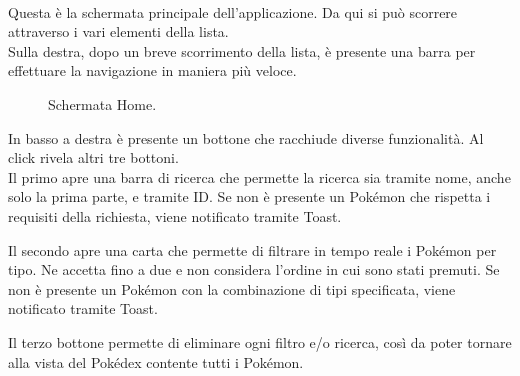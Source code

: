 \documentclass[a4paper,11pt]{article}
\begin{document}
  \paragraph{}
  Questa è la schermata principale dell’applicazione. Da qui si può scorrere attraverso i vari elementi della lista.\\
Sulla destra, dopo un breve scorrimento della lista, è presente una barra per effettuare la navigazione in maniera più veloce.\\
  \begin{figure}[h!]
    \centering
	\caption{Schermata Home.}
\end{figure}
\newpage
In basso a destra è presente un bottone che racchiude diverse funzionalità. Al click rivela altri tre bottoni.\\Il primo apre una barra di ricerca che permette la ricerca sia tramite nome, anche solo la prima parte, e tramite ID. Se non è presente un Pokémon che rispetta i requisiti della richiesta, viene notificato tramite Toast.

Il secondo apre una carta che permette di filtrare in tempo reale i Pokémon per tipo. Ne accetta fino a due e non considera l’ordine in cui sono stati premuti. Se non è presente un Pokémon con la combinazione di tipi specificata, viene notificato tramite Toast.

Il terzo bottone permette di eliminare ogni filtro e/o ricerca, così da poter tornare alla vista del Pokédex contente tutti i Pokémon.
\end{document}
